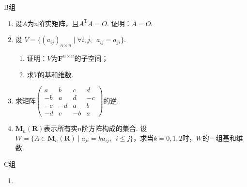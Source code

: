 \centerline{\heiti B组}
\begin{enumerate}
    \item 设$A$为$n$阶实矩阵，且$A^\mathrm{T}A=O$. 证明：$A=O$.

    \item 设 $V=\{(a_{ij})_{n \times n} \mid \forall i,j,\enspace a_{ij}=a_{ji}\}$.
          \begin{enumerate}
              \item 证明：$V$为$\mathbf{F}^{n \times n}$的子空间；

              \item 求$V$的基和维数.
          \end{enumerate}

    \item 求矩阵$\begin{pmatrix}
                  a  & b  & c  & d  \\
                  -b & a  & d  & -c \\
                  -c & -d & a  & b  \\
                  -d & c  & -b & a
              \end{pmatrix}$的逆.

    \item $\mathbf{M}_n(\mathbf{R})$表示所有实$n$阶方阵构成的集合. 设$W=\{A\in \mathbf{M}_n(\mathbf{R}) \mid a_{ji}=ka_{ij},\enspace i \leqslant j\}$，求当$k=0,1,2$时，$W$的一组基和维数.
\end{enumerate}

\centerline{\heiti C组}
\begin{enumerate}
    \item
\end{enumerate}
